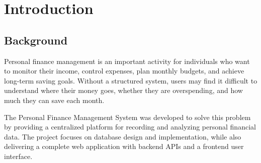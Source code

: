 \documentclass{article}
\newcommand{\projectname}{Personal Finance Management System}
\newcommand{\dbname}{Personal\_Finance}
\begin{document}
\clearpage
\tableofcontents

\newpage

\begin{abstract}
This report presents the design and implementation of the \projectname, a full-stack database-driven web application for managing personal financial activities. The system supports user management, authentication, bank accounts, income and expense tracking, expense categorization, monthly budget planning, fixed expenses, saving goals, goal contributions, transaction import, financial reports, and administrative functions. The database is implemented in MySQL under the schema name \dbname, while the backend is developed with FastAPI and Python, and the frontend is implemented with Next.js, TypeScript, and Tailwind CSS. The report describes the system requirements, architecture, database design, ERD diagrams, SQL implementation, backend and frontend modules, testing process, security mechanisms, limitations, and future improvements. The project demonstrates how relational database concepts such as primary keys, foreign keys, normalization, constraints, indexes, views, stored procedures, functions, and triggers can be applied to a practical personal finance management system.
\end{abstract}
\section{Introduction}

\subsection{Background}
Personal finance management is an important activity for individuals who want to monitor their income, control expenses, plan monthly budgets, and achieve long-term saving goals. Without a structured system, users may find it difficult to understand where their money goes, whether they are overspending, and how much they can save each month.

The \projectname{} was developed to solve this problem by providing a centralized platform for recording and analyzing personal financial data. The project focuses on database design and implementation, while also delivering a complete web application with backend APIs and a frontend user interface.
\end{document}
